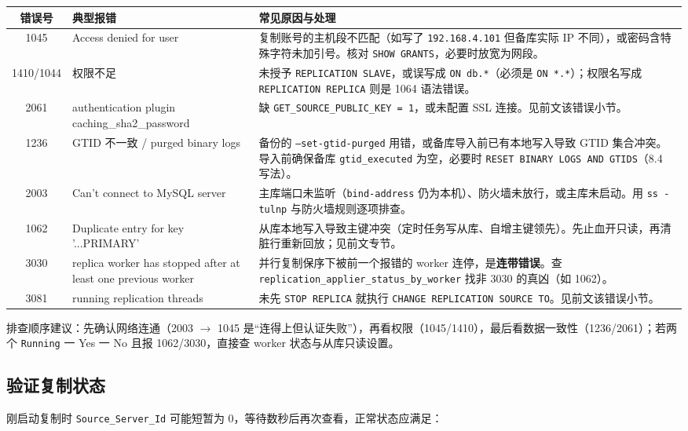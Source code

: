 \documentclass[12pt,UTF8]{ctexbook}
\begin{document}
\begin{tabular}{|c|p{3.2cm}|p{8cm}|}
\hline
\textbf{错误号} & \textbf{典型报错} & \textbf{常见原因与处理} \\
\hline
1045 & Access denied for user & 复制账号的主机段不匹配（如写了 \texttt{192.168.4.101} 但备库实际 IP 不同），或密码含特殊字符未加引号。核对 \texttt{SHOW GRANTS}，必要时放宽为网段。 \\
\hline
1410/1044 & 权限不足 & 未授予 \texttt{REPLICATION SLAVE}，或误写成 \texttt{ON db.*}（必须是 \texttt{ON *.*}）；权限名写成 \texttt{REPLICATION REPLICA} 则是 1064 语法错误。 \\
\hline
2061 & authentication plugin caching\_sha2\_password & 缺 \texttt{GET\_SOURCE\_PUBLIC\_KEY = 1}，或未配置 SSL 连接。见前文该错误小节。 \\
\hline
1236 & GTID 不一致 / purged binary logs & 备份的 \texttt{--set-gtid-purged} 用错，或备库导入前已有本地写入导致 GTID 集合冲突。导入前确保备库 \texttt{gtid\_executed} 为空，必要时 \texttt{RESET BINARY LOGS AND GTIDS}（8.4 写法）。 \\
\hline
2003 & Can't connect to MySQL server & 主库端口未监听（\texttt{bind-address} 仍为本机）、防火墙未放行，或主库未启动。用 \texttt{ss -tulnp} 与防火墙规则逐项排查。 \\
\hline
1062 & Duplicate entry for key '...PRIMARY' & 从库本地写入导致主键冲突（定时任务写从库、自增主键领先）。先止血开只读，再清脏行重新回放；见前文专节。 \\
\hline
3030 & replica worker has stopped after at least one previous worker & 并行复制保序下被前一个报错的 worker 连停，是\textbf{连带错误}。查 \texttt{replication\_applier\_status\_by\_worker} 找非 3030 的真凶（如 1062）。 \\
\hline
3081 & running replication threads & 未先 \texttt{STOP REPLICA} 就执行 \texttt{CHANGE REPLICATION SOURCE TO}。见前文该错误小节。 \\
\hline
\end{tabular}

排查顺序建议：先确认网络连通（2003 $\to$ 1045 是“连得上但认证失败”），再看权限（1045/1410），最后看数据一致性（1236/2061）；若两个 \texttt{Running} 一 Yes 一 No 且报 1062/3030，直接查 worker 状态与从库只读设置。

\subsection{验证复制状态}

刚启动复制时 \texttt{Source\_Server\_Id} 可能短暂为 0，等待数秒后再次查看，正常状态应满足：
\end{document}

